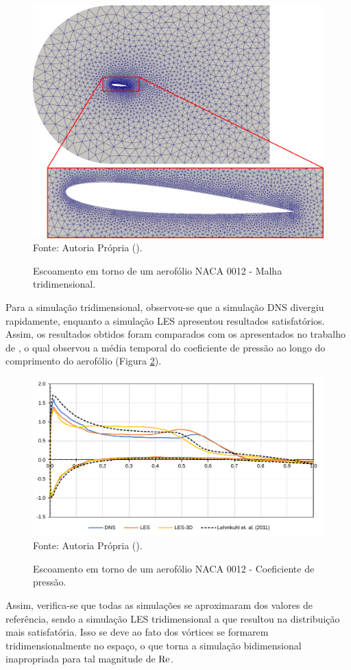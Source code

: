 \begin{figure}[h!]
    \centering
    \caption{Escoamento em torno de um aerofólio NACA 0012 - Malha tridimensional.}
    \includegraphics[width=.7\linewidth]{Figuras/NACA0012/mesh3D.png}
    \\Fonte: Autoria Própria (\the\year).
    \label{fig:NACA0012-mesh3D}
\end{figure}

Para a simulação tridimensional, observou-se que a simulação DNS divergiu rapidamente, enquanto a simulação LES apresentou resultados satisfatórios. Assim, os resultados obtidos foram comparados com os apresentados no trabalho de , o qual observou a média temporal do coeficiente de pressão ao longo do comprimento do aerofólio (Figura \ref{fig:NACA0012-Cp}).

\begin{figure}[h!]
    \centering
    \caption{Escoamento em torno de um aerofólio NACA 0012 - Coeficiente de pressão.}
    \includegraphics[width=.7\linewidth]{Figuras/NACA0012/Cp.pdf}
    \\Fonte: Autoria Própria (\the\year).
    \label{fig:NACA0012-Cp}
\end{figure}

Assim, verifica-se que todas as simulações se aproximaram dos valores de referência, sendo a simulação LES tridimensional a que resultou na distribuição mais satisfatória. Isso se deve ao fato dos vórtices se formarem tridimensionalmente no espaço, o que torna a simulação bidimensional inapropriada para tal magnitude de $\mathrm{Re}$.

